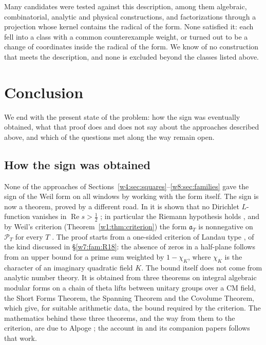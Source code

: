 \documentclass[11pt]{amsart}
\theoremstyle{definition}
\theoremstyle{remark}
\numberwithin{equation}{section}
\DeclareMathOperator{\Rel}{Re}
\newcommand{\PT}{\mathcal{P}_T}                        %
\newcommand{\aT}{\mathfrak{a}_T}                       %
\begin{document}
Many candidates were tested against this description, among them algebraic, combinatorial, analytic and
physical constructions, and factorizations through a projection whose kernel contains the radical of the form.
None satisfied it: each fell into a class with a common counterexample weight, or turned out to be a change of
coordinates inside the radical of the form. We know of no construction that meets the description, and none is
excluded beyond the classes listed above.

\section{Conclusion}\label{w8:sec:open}

We end with the present state of the problem: how the sign was eventually obtained, what that proof does and does
not say about the approaches described above, and which of the questions met along the way remain open.

\subsection{How the sign was obtained}

None of the approaches of Sections~\ref{w4:sec:squares}--\ref{w8:sec:families} gave the sign of the Weil form on
all windows by working with the form itself. The sign is now a theorem, proved by a different road. In
\cite{P46} it is shown that no Dirichlet $L$-function vanishes in $\Rel s>\frac12$
\cite[Theorem~15.5]{P46}; in particular the Riemann hypothesis holds \cite[Theorem~16.1]{P46}, and by Weil's
criterion (Theorem~\ref{w1:thm:criterion}) the form $\aT$ is nonnegative on $\PT$ for every $T$
\cite[Corollary~16.3]{P46}. The proof starts from a one-sided criterion of Landau type
\cite[Theorem~12.9]{P46}, of the kind discussed in \S\ref{w7:fam:R18}: the absence of zeros in a half-plane
follows from an upper bound for a prime sum weighted by $1-\chi_K$, where $\chi_K$ is the character of an
imaginary quadratic field $K$. The bound itself does not come from analytic number theory. It is obtained from
three theorems on integral algebraic modular forms on a chain of theta lifts between unitary groups over a CM
field, the Short Forms Theorem, the Spanning Theorem and the Covolume Theorem, which give, for suitable arithmetic
data, the bound required by the criterion. The mathematics behind these three theorems, and the way from them to
the criterion, are due to Alpoge \cite{CharacterFamily}; the account in \cite{P46} and its companion papers follows that work.
\end{document}
